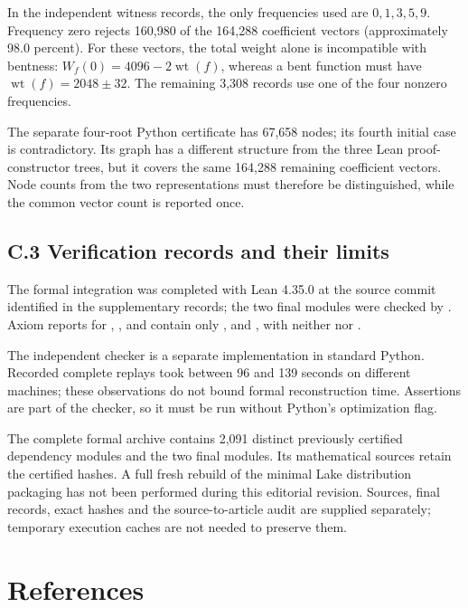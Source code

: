 \documentclass[11pt,a4paper]{article}
\begin{document}
In the independent witness records, the only frequencies used are $0,1,3,5,9$. Frequency zero rejects 160,980 of the 164,288 coefficient vectors (approximately 98.0 percent). For these vectors, the total weight alone is incompatible with bentness: $W_f(0)=4096-2\operatorname{wt}(f)$, whereas a bent function must have $\operatorname{wt}(f)=2048\pm32$. The remaining 3,308 records use one of the four nonzero frequencies.

The separate four-root Python certificate has 67,658 nodes; its fourth initial case is contradictory. Its graph has a different structure from the three Lean proof-constructor trees, but it covers the same 164,288 remaining coefficient vectors. Node counts from the two representations must therefore be distinguished, while the common vector count is reported once.

\subsection*{C.3 Verification records and their limits}

The formal integration was completed with Lean 4.35.0 at the source commit identified in the supplementary records; the two final modules were checked by . Axiom reports for , ,  and  contain only ,  and , with neither  nor .

The independent checker is a separate implementation in standard Python. Recorded complete replays took between 96 and 139 seconds on different machines; these observations do not bound formal reconstruction time. Assertions are part of the checker, so it must be run without Python's optimization flag.

The complete formal archive contains 2,091 distinct previously certified dependency modules and the two final modules. Its mathematical sources retain the certified hashes. A full fresh rebuild of the minimal Lake distribution packaging has not been performed during this editorial revision. Sources, final records, exact hashes and the source-to-article audit are supplied separately; temporary execution caches are not needed to preserve them.

\clearpage
\section*{References}
\end{document}
